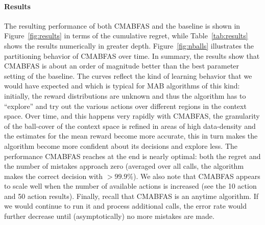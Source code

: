 \documentclass{llncs}
\begin{document}
\paragraph{Results}
The resulting performance of both CMABFAS and the baseline is shown in Figure~\ref{fig:results} in terms 
of the cumulative regret, while Table~\ref{tab:results} shows the results numerically in greater depth. 
Figure~\ref{fig:nballs} illustrates the partitioning behavior of CMABFAS over time. In summary, the results
show that CMABFAS is about an order of magnitude better than the best parameter setting of the baseline. 
The curves reflect the kind of learning behavior that we would have expected and which is typical for MAB
algorithms of this kind: initially, the reward distributions are unknown and thus the algorithm has to ``explore'' and try out the various 
actions over different regions in the context space. Over time, and this happens very rapidly with CMABFAS, 
the granularity of the ball-cover of the context space is refined in areas of high data-density 
and the estimates for the mean reward become more accurate, this in turn makes the algorithm become more
confident about its decisions and explore less. The performance CMABFAS reaches at the end is nearly 
optimal: both the regret and the number of mistakes approach zero (averaged over all calls, the algorithm 
makes the correct decision with $> 99.9$\%). We also note that CMABFAS appears to scale well when the 
number of available actions is increased (see the 10 action and 50 action results).
Finally, recall that CMABFAS is an anytime algorithm. If we 
would continue to run it and process additional calls, the error rate would further decrease until 
(asymptotically) no more mistakes are made.
\end{document}

